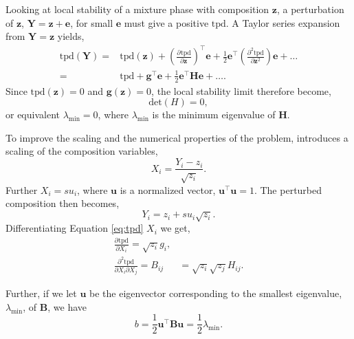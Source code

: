 \documentclass[internal,english]{sintefmemo2012}
\newcommand*{\pd}[3][]{\frac{\partial^{#1}#2}{\partial{#3}^{#1}}}%
\newcommand*{\vektor}[1]{\boldsymbol{#1}}%
\newcommand{\wrpt}{\text{with respect to~}}
\newcommand{\tpd}{\ensuremath{\text{tpd}}\xspace}
\begin{document}
Looking at local stability of a mixture phase with composition $\vektor{z}$, a
perturbation of $\vektor{z}$, $\vektor{Y} = \vektor{z} + \vektor{e}$, for small $\vektor{e}$ must give a positive
\tpd. A Taylor series expansion from $\vektor{Y}=\vektor{z}$ yields,
\begin{align}
  \tpd(\vektor{Y}) =& \tpd(\vektor{z}) + \left(\pd{\tpd}{\vektor{z}}\right)^\intercal\vektor{e} + \frac{1}{2}\vektor{e}^\intercal\left(\pd[2]{\tpd}{\vektor{z}}\right)\vektor{e} + \dots \\
  =& \tpd + \vektor{g}^\intercal \vektor{e} + \frac{1}{2}\vektor{e}^\intercal\vektor{H}\vektor{e} + \dots.
  \label{eq:tpdTaylor}
\end{align}
Since $\tpd(\vektor{z}) = 0$ and $\vektor{g}(\vektor{z}) = 0$, the local stability limit therefore become,
\begin{equation}
  \text{det}\left(H\right) = 0,
  \label{eq:detM}
\end{equation}
or equivalent $\lambda_{\text{min}} = 0$, where $\lambda_{\text{min}}$
is the minimum eigenvalue of $\vektor{H}$.

To improve the scaling and the numerical properties of the problem,
\citet{Michelsen1984} introduces a scaling of the composition
variables,
\begin{equation}
  \label{eq:X}
  X_i = \frac{Y_i-z_i}{\sqrt{z_i}}.
\end{equation}
Further $X_i = s u_i$, where $\vektor{u}$ is a normalized vector,
$\vektor{u}^\intercal\vektor{u} = 1$. The perturbed composition then becomes,
\begin{equation}
  \label{eq:Y}
  Y_i = z_i + s u_i\sqrt{z_i}.
\end{equation}
Differentiating Equation \ref{eq:tpd} \wrpt $X_i$ we get,
\begin{align}
  \pd{\tpd}{X_i} = \sqrt{z_i}g_i,\\
  \frac{\partial^2\tpd}{\partial X_i \partial X_j} = B_{ij} &=  \sqrt{z_i}\sqrt{z_j}H_{ij}.
  \label{eq:dtpdX}
\end{align}

Further, if we let $\vektor{u}$ be the eigenvector corresponding to the smallest
eigenvalue, $\lambda_{\text{min}}$, of $\vektor{B}$, we have
\begin{equation}
  \label{eq:b}
  b = \frac{1}{2}\vektor{u}^{\top}\vektor{B}\vektor{u} = \frac{1}{2} \lambda_{\text{min}}.
\end{equation}
\end{document}
